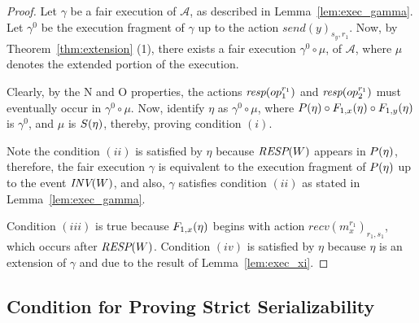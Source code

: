 \begin{proof}
Let $\gamma$ be a fair execution of $\mathcal{A}$, as described in Lemma~\ref{lem:exec_gamma}. 
 Let $\gamma^0$ be the execution fragment of $\gamma$
up to the action $send(y)_{s_y, r_1}$. Now, by Theorem~\ref{thm:extension} (1), there exists a fair execution $\gamma^0 \circ \mu$, of 
$\mathcal{A}$, where $\mu$ denotes the extended portion of the execution.

 Clearly, by the N and O properties, 
the actions  ${\textit{resp}(op_1^{r_1})}$ and ${\textit{resp}(op_2^{r_1})}$ must eventually occur in $\gamma^0 \circ \mu$.
 Now,  identify $\eta$ as $\gamma^0 \circ \mu$,  where ${ P(\eta)} \circ { F_{1, x}(\eta)} \circ { F_{1, y}(\eta)}$  is $\gamma^0$,   and $\mu$ is ${ S(\eta)}$, thereby, proving condition $(i)$.

Note the condition $(ii)$ is satisfied by $\eta$ because ${\textit{RESP}(W)}$ appears in ${ P(\eta)}$, therefore, the fair execution $\gamma$ is equivalent to the execution fragment of ${ P(\eta)}$ up to the event ${\textit{INV}(W)}$, and  also, 
$\gamma$ satisfies condition $(ii)$ as stated in Lemma~\ref{lem:exec_gamma}.

Condition $(iii)$ is true because ${ F_{1, x}(\eta)}$ begins with action $recv(m_x^{r_1})_{r_1, s_1}$, which 
occurs after ${\textit{RESP}(W)}$.
Condition $(iv)$ is satisfied by $\eta$ because $\eta$ is an extension of $\gamma$ and due to  the result of Lemma~\ref{lem:exec_xi}.
\end{proof}



\subsection{Condition for Proving Strict Serializability}\label{sc_condition_app}


